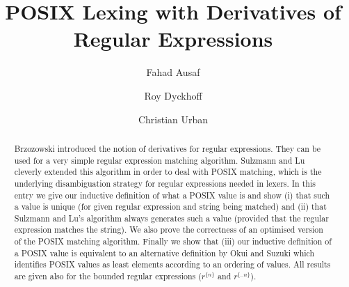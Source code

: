 \documentclass[11pt,a4paper]{article}
\begin{document}
\title{POSIX Lexing with Derivatives of Regular Expressions}
\author{Fahad Ausaf \and Roy Dyckhoff \and Christian Urban}
\maketitle

\begin{abstract}
  Brzozowski introduced the notion of derivatives for regular
  expressions. They can be used for a very simple regular expression
  matching algorithm. Sulzmann and Lu \cite{Sulzmann2014} cleverly extended this algorithm
  in order to deal with POSIX matching, which is the underlying
  disambiguation strategy for regular expressions needed in
  lexers. In this entry we give our inductive definition
  of what a POSIX value is and show (i) that such a value is unique (for
  given regular expression and string being matched) and (ii) that
  Sulzmann and Lu's algorithm always generates such a value (provided
  that the regular expression matches the string). We also prove the
  correctness of an optimised version of the POSIX matching
  algorithm. Finally we show that
  (iii) our inductive definition of a POSIX value is equivalent
  to an alternative definition by Okui and Suzuki \cite{OkuiSuzuki2010} which
  identifies POSIX values as least elements according to an
  ordering of values. All results are given also for the bounded
  regular expressions ($r^{\{n\}}$ and $r^{\{..n\}}$).
\end{abstract}

\tableofcontents





\end{document}
